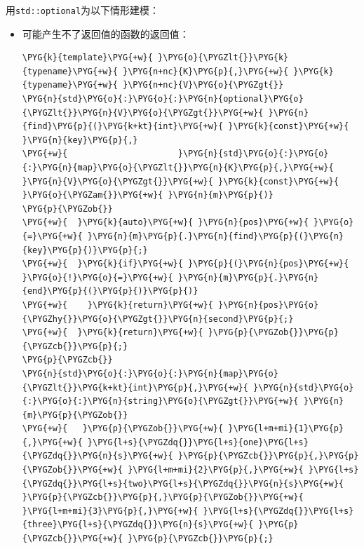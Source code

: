 
用\texttt{std::\allowbreak{}optional}为以下情形建模：



\begin{itemize}
\item 可能产生不了返回值的函数的返回值：



\begin{codeblockbg}
\begin{Verbatim}[commandchars=\\\{\},breaklines=true,breakanywhere=true,fontsize=\codefont,xleftmargin=17bp]
\PYG{k}{template}\PYG{+w}{ }\PYG{o}{\PYGZlt{}}\PYG{k}{typename}\PYG{+w}{ }\PYG{n+nc}{K}\PYG{p}{,}\PYG{+w}{ }\PYG{k}{typename}\PYG{+w}{ }\PYG{n+nc}{V}\PYG{o}{\PYGZgt{}}
\PYG{n}{std}\PYG{o}{:}\PYG{o}{:}\PYG{n}{optional}\PYG{o}{\PYGZlt{}}\PYG{n}{V}\PYG{o}{\PYGZgt{}}\PYG{+w}{ }\PYG{n}{find}\PYG{p}{(}\PYG{k+kt}{int}\PYG{+w}{ }\PYG{k}{const}\PYG{+w}{ }\PYG{n}{key}\PYG{p}{,}
\PYG{+w}{                      }\PYG{n}{std}\PYG{o}{:}\PYG{o}{:}\PYG{n}{map}\PYG{o}{\PYGZlt{}}\PYG{n}{K}\PYG{p}{,}\PYG{+w}{ }\PYG{n}{V}\PYG{o}{\PYGZgt{}}\PYG{+w}{ }\PYG{k}{const}\PYG{+w}{ }\PYG{o}{\PYGZam{}}\PYG{+w}{ }\PYG{n}{m}\PYG{p}{)}
\PYG{p}{\PYGZob{}}
\PYG{+w}{  }\PYG{k}{auto}\PYG{+w}{ }\PYG{n}{pos}\PYG{+w}{ }\PYG{o}{=}\PYG{+w}{ }\PYG{n}{m}\PYG{p}{.}\PYG{n}{find}\PYG{p}{(}\PYG{n}{key}\PYG{p}{)}\PYG{p}{;}
\PYG{+w}{  }\PYG{k}{if}\PYG{+w}{ }\PYG{p}{(}\PYG{n}{pos}\PYG{+w}{ }\PYG{o}{!}\PYG{o}{=}\PYG{+w}{ }\PYG{n}{m}\PYG{p}{.}\PYG{n}{end}\PYG{p}{(}\PYG{p}{)}\PYG{p}{)}
\PYG{+w}{    }\PYG{k}{return}\PYG{+w}{ }\PYG{n}{pos}\PYG{o}{\PYGZhy{}}\PYG{o}{\PYGZgt{}}\PYG{n}{second}\PYG{p}{;}
\PYG{+w}{  }\PYG{k}{return}\PYG{+w}{ }\PYG{p}{\PYGZob{}}\PYG{p}{\PYGZcb{}}\PYG{p}{;}
\PYG{p}{\PYGZcb{}}
\PYG{n}{std}\PYG{o}{:}\PYG{o}{:}\PYG{n}{map}\PYG{o}{\PYGZlt{}}\PYG{k+kt}{int}\PYG{p}{,}\PYG{+w}{ }\PYG{n}{std}\PYG{o}{:}\PYG{o}{:}\PYG{n}{string}\PYG{o}{\PYGZgt{}}\PYG{+w}{ }\PYG{n}{m}\PYG{p}{\PYGZob{}}
\PYG{+w}{   }\PYG{p}{\PYGZob{}}\PYG{+w}{ }\PYG{l+m+mi}{1}\PYG{p}{,}\PYG{+w}{ }\PYG{l+s}{\PYGZdq{}}\PYG{l+s}{one}\PYG{l+s}{\PYGZdq{}}\PYG{n}{s}\PYG{+w}{ }\PYG{p}{\PYGZcb{}}\PYG{p}{,}\PYG{p}{\PYGZob{}}\PYG{+w}{ }\PYG{l+m+mi}{2}\PYG{p}{,}\PYG{+w}{ }\PYG{l+s}{\PYGZdq{}}\PYG{l+s}{two}\PYG{l+s}{\PYGZdq{}}\PYG{n}{s}\PYG{+w}{ }\PYG{p}{\PYGZcb{}}\PYG{p}{,}\PYG{p}{\PYGZob{}}\PYG{+w}{ }\PYG{l+m+mi}{3}\PYG{p}{,}\PYG{+w}{ }\PYG{l+s}{\PYGZdq{}}\PYG{l+s}{three}\PYG{l+s}{\PYGZdq{}}\PYG{n}{s}\PYG{+w}{ }\PYG{p}{\PYGZcb{}}\PYG{+w}{ }\PYG{p}{\PYGZcb{}}\PYG{p}{;}

\end{Verbatim}
\end{codeblockbg}
\end{itemize}
